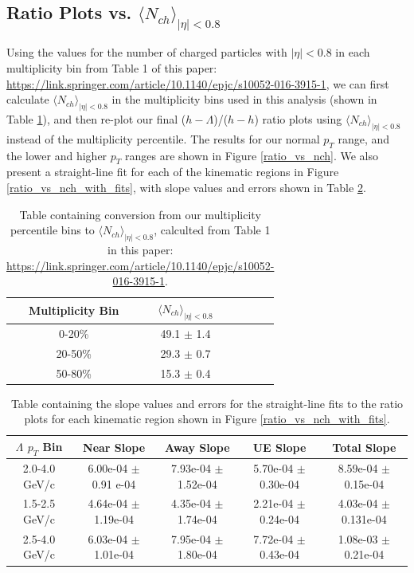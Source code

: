 \documentclass[ALICE,manyauthors]{ALICE_analysis_notes}
\begin{document}
\clearpage

\subsection{Ratio Plots vs. $\langle N_{ch} \rangle_{|\eta| < 0.8}$}

Using the values for the number of charged particles with $|\eta| < 0.8$ in each multiplicity bin from Table 1 of this paper: \url{https://link.springer.com/article/10.1140/epjc/s10052-016-3915-1}, we can first calculate $\langle N_{ch} \rangle_{|\eta| < 0.8}$ in the multiplicity bins used in this analysis (shown in Table \ref{mult_to_nch}), and then re-plot our final ($h-\Lambda$)/($h-h$) ratio plots using $\langle N_{ch} \rangle_{|\eta| < 0.8}$ instead of the multiplicity percentile. The results for our normal $p_{T}$ range, and the lower and higher $p_{T}$ ranges are shown in Figure \ref{ratio_vs_nch}. We also present a straight-line fit for each of the kinematic regions in Figure \ref{ratio_vs_nch_with_fits}, with slope values and errors shown in Table \ref{ratio_vs_nch_fit_table}. 

\begin{table}[h!]
\centering
\begin{tabular}{| c | c | c | c | c | }
\hline
Multiplicity Bin & $\langle N_{ch} \rangle_{|\eta| < 0.8}$ \\
\hline
0-20\% & 49.1 $\pm$ 1.4 \\
20-50\% & 29.3 $\pm$ 0.7 \\
50-80\% & 15.3 $\pm$ 0.4 \\
\hline
\end{tabular}
\caption{Table containing conversion from our multiplicity percentile bins to $\langle N_{ch} \rangle_{|\eta| < 0.8}$, calculted from Table 1 in this paper: \url{https://link.springer.com/article/10.1140/epjc/s10052-016-3915-1}.}
\label{mult_to_nch}
\end{table}

\begin{table}[h!]
\centering
\begin{tabular}{| c | c | c | c | c | }
\hline
$\Lambda$ $p_{T}$ Bin & Near Slope & Away Slope & UE Slope & Total Slope \\
\hline
2.0-4.0 GeV/c & 6.00e-04 $\pm$ 0.91 e-04  & 7.93e-04 $\pm$ 1.52e-04 &  5.70e-04 $\pm$ 0.30e-04 & 8.59e-04 $\pm$ 0.15e-04 \\
1.5-2.5 GeV/c & 4.64e-04 $\pm$ 1.19e-04 & 4.35e-04 $\pm$ 1.74e-04 & 2.21e-04 $\pm$ 0.24e-04 & 4.03e-04 $\pm$ 0.131e-04 \\
2.5-4.0 GeV/c & 6.03e-04 $\pm$ 1.01e-04 & 7.95e-04 $\pm$ 1.80e-04 & 7.72e-04 $\pm$ 0.43e-04 & 1.08e-03 $\pm$ 0.21e-04 \\
\hline
\end{tabular}
\caption{Table containing the slope values and errors for the straight-line fits to the ratio plots for each kinematic region shown in Figure \ref{ratio_vs_nch_with_fits}.}
\label{ratio_vs_nch_fit_table}
\end{table}
\end{document}
